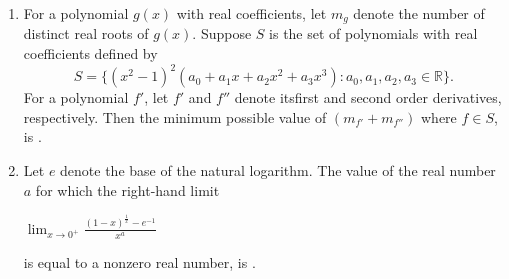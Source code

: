 \documentclass{article}
\begin{document}
\begin{enumerate}
\item   For a polynomial $g(x)$ with real coefficients, let $m_g$ denote the number of distinct real roots of $g(x)$. Suppose $S$ is the set of polynomials with real coefficients defined by\[S = \{(x^2 - 1)^2 (a_0 + a_1 x + a_2 x^2 + a_3 x^3) : a_0, a_1, a_2, a_3 \in \mathbb{R} \}.\]For a polynomial $f'$, let $f'$ and $f''$ denote itsfirst and second order derivatives, respectively. Then the minimum possible value of $(m_{f'} + m_{f''})$ where $f \in S$, is \underline{\hspace{2cm}}.

\item   Let $e$ denote the base of the natural logarithm. The value of the real number $a$ for which the right-hand limit

\begin{center}
    $\lim_{x \to 0^+} \frac{(1 - x)^{\frac{1}{x}} - e^{-1}}{x^a}$
\end{center}

    is equal to a nonzero real number, is \underline{\hspace{2cm}}.


\end{enumerate}
\end{document}
